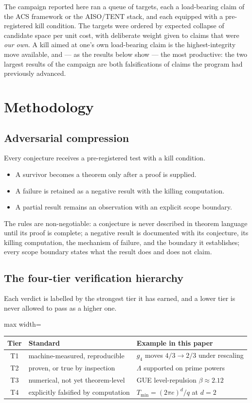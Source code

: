\documentclass[11pt]{article}
\newcommand{\Tmin}{T_{\min}}
\newcommand{\tier}[1]{\textsf{#1}}
\begin{document}
The campaign reported here ran a queue of targets, each a load-bearing claim of the ACS
framework or the AISO/TENT stack, and each equipped with a pre-registered kill
condition. The targets were ordered by expected collapse of candidate space per unit
cost, with deliberate weight given to claims that were \emph{our own}. A kill aimed at
one's own load-bearing claim is the highest-integrity move available, and --- as the
results below show --- the most productive: the two largest results of the campaign are
both falsifications of claims the program had previously advanced.

\section{Methodology}

\subsection{Adversarial compression}
Every conjecture receives a pre-registered test with a kill condition.
\begin{itemize}
\item A survivor becomes a theorem only after a proof is supplied.
\item A failure is retained as a negative result with the killing computation.
\item A partial result remains an observation with an explicit scope boundary.
\end{itemize}
The rules are non-negotiable: a conjecture is never described in theorem language until
its proof is complete; a negative result is documented with its conjecture, its killing
computation, the mechanism of failure, and the boundary it establishes; every scope
boundary states what the result does and does not claim.

\subsection{The four-tier verification hierarchy}
Each verdict is labelled by the strongest tier it has earned, and a lower tier is never
allowed to pass as a higher one.
\begin{center}
\begin{adjustbox}{max width=\linewidth}\begin{tabular}{cll}
\toprule
Tier & Standard & Example in this paper\\
\midrule
\tier{T1} & machine-measured, reproducible & $g_4$ moves $4/3\!\to\!2/3$ under rescaling\\
\tier{T2} & proven, or true by inspection & $\Lambda$ supported on prime powers\\
\tier{T3} & numerical, not yet theorem-level & GUE level-repulsion $\beta\approx 2.12$\\
\tier{T4} & explicitly falsified by computation & $\Tmin=(2\pi e)^d/q$ at $d=2$\\
\bottomrule
\end{tabular}\end{adjustbox}
\end{center}
\end{document}
